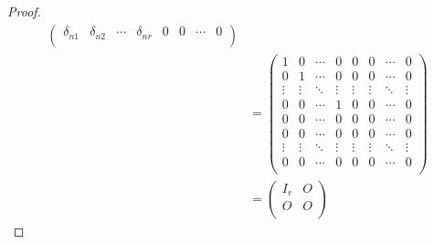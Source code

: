 \documentclass[dvipdfmx]{jsarticle}
\begin{document}
\begin{proof}
\begin{align*}
\begin{pmatrix}
\delta_{n1} & \delta_{n2} & \cdots & \delta_{nr} & 0 & 0 & \cdots & 0 \\
\end{pmatrix}\\
&= \begin{pmatrix}
1 & 0 & \cdots & 0 & 0 & 0 & \cdots & 0 \\
0 & 1 & \cdots & 0 & 0 & 0 & \cdots & 0 \\
 \vdots & \vdots & \ddots & \vdots & \vdots & \vdots & \ddots & \vdots \\
0 & 0 & \cdots & 1 & 0 & 0 & \cdots & 0 \\
0 & 0 & \cdots & 0 & 0 & 0 & \cdots & 0 \\
0 & 0 & \cdots & 0 & 0 & 0 & \cdots & 0 \\
 \vdots & \vdots & \ddots & \vdots & \vdots & \vdots & \ddots & \vdots \\
0 & 0 & \cdots & 0 & 0 & 0 & \cdots & 0 \\
\end{pmatrix}\\
&= \begin{pmatrix}
I_{r} & O \\
O & O \\
\end{pmatrix}
\end{align*}
\end{proof}
\end{document}
